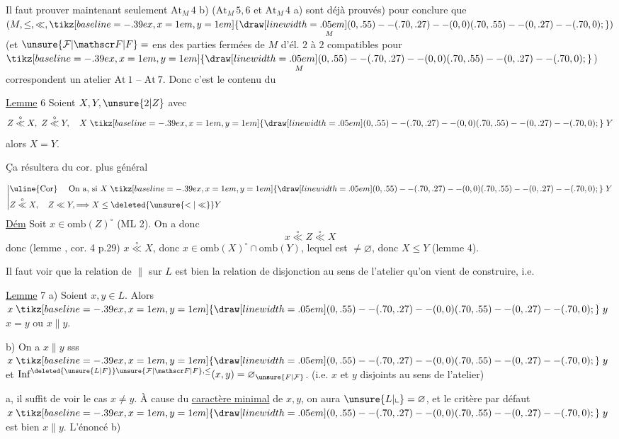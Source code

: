  Il faut prouver maintenant seulement $\mathrm{At}_M\,4$  b) ($\mathrm{At}_M\,5,6$ et $\mathrm{At}_M\,4$ a) sont déjà prouvés) pour conclure que $(M,\leq,\ll,\underset{M}{\mathrel{\tikz[baseline=-.39ex,x=1em,y=1em]{\draw[line width=.05em] (0,.55)--(.70,.27)--(0,0) (.70,.55)--(0,.27)--(.70,0);}}})$ (et  $\unsure{\mathcal F|\mathscr F|F}={}$ens des parties fermées de $M$  d'él. $2$ à $2$ compatibles pour $\underset{M}{\mathrel{\tikz[baseline=-.39ex,x=1em,y=1em]{\draw[line width=.05em] (0,.55)--(.70,.27)--(0,0) (.70,.55)--(0,.27)--(.70,0);}}}$)
 correspondent  un atelier $\mathrm{At}\ 1$ -- $\mathrm{At}\ 7$. Donc c'est le contenu du

\uline{Lemme} 6 \quad Soient $X,Y,\unsure{2|Z}$ avec
\[
 Z\overset{\circ}{\ll}X,\ Z\overset{\circ}{\ll}Y,\quad X\mathrel{\tikz[baseline=-.39ex,x=1em,y=1em]{\draw[line width=.05em] (0,.55)--(.70,.27)--(0,0) (.70,.55)--(0,.27)--(.70,0);}}Y
\]
alors $X=Y$.

Ça résultera du cor. plus général

\[
\left|\begin{aligned}
&\text{\uline{Cor} \quad On a, si }X\mathrel{\tikz[baseline=-.39ex,x=1em,y=1em]{\draw[line width=.05em] (0,.55)--(.70,.27)--(0,0) (.70,.55)--(0,.27)--(.70,0);}}Y\\
& Z\overset{\circ}{\ll}X,\quad Z\ll Y,\Longrightarrow X\leq\deleted{\unsure{<|\ll}}Y
\end{aligned}\right.
\]
\uline{Dém} \quad Soit $x\in\mathrm{omb}(Z)^\circ$ (ML 2). On a donc 
\[
 x\overset{\circ}{\ll}Z\overset{\circ}{\ll}X
\]
donc (lemme , cor. 4 p.29) $x\overset{\circ}{\ll}X$, donc $x\in\mathrm{omb}(X)^\circ\cap\mathrm{omb}(Y)$, lequel est $\neq\varnothing$, donc $X\leq Y$ (lemme 4).

Il faut voir que la relation de  $\parallel$ sur $L$ est bien la relation de disjonction au sens de l'atelier qu'on vient de construire, i.e.

\uline{Lemme} 7 \quad {} a) Soient $x,y\in L$. Alors $x\mathrel{\tikz[baseline=-.39ex,x=1em,y=1em]{\draw[line width=.05em] (0,.55)--(.70,.27)--(0,0) (.70,.55)--(0,.27)--(.70,0);}}y$  $x=y$ ou $x\parallel y$.

b) On a $x\parallel y$ sss $x\mathrel{\tikz[baseline=-.39ex,x=1em,y=1em]{\draw[line width=.05em] (0,.55)--(.70,.27)--(0,0) (.70,.55)--(0,.27)--(.70,0);}}y$ et $\mathrm{Inf}^{\deleted{\unsure{L|F}}\unsure{\mathcal F|\mathscr F|F},\leq}(x,y)=\varnothing_{\unsure{F|\mathcal F}}$. (i.e. $x$ et $y$ disjoints au sens de l'atelier)

 a, il suffit de voir le cas $x\neq y$. À cause du \uline{caractère minimal} de $x,y$, on aura  $\unsure{L|\llcorner}=\varnothing$, et le critère  par défaut $x\mathrel{\tikz[baseline=-.39ex,x=1em,y=1em]{\draw[line width=.05em] (0,.55)--(.70,.27)--(0,0) (.70,.55)--(0,.27)--(.70,0);}}y$ est bien $x\parallel y$. L'énoncé b) 
